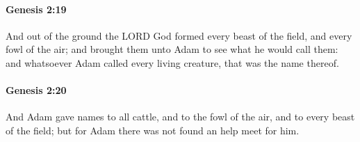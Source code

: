 		\paragraph{Genesis 2:19} %
			\label{GENESIS-2-19}

			And out of the ground the LORD God formed every beast of the field, and every fowl of the air; and brought them unto Adam to see what he would call them: and whatsoever Adam called every living creature, that was the name thereof.


		\paragraph{Genesis 2:20} %
			\label{GENESIS-2-20}

			And Adam gave names to all cattle, and to the fowl of the air, and to every beast of the field; but for Adam there was not found an help meet for him.


